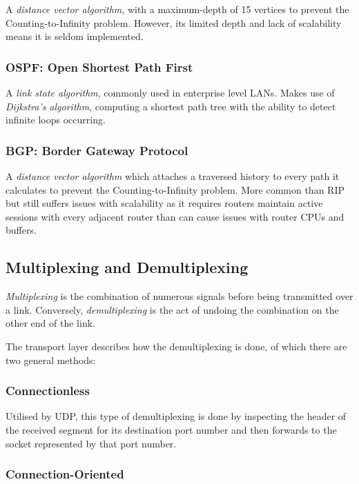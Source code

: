 \documentclass{article}
\begin{document}
A \textit{distance vector algorithm}, with a maximum-depth of 15 vertices to prevent the Counting-to-Infinity problem. However, its limited depth and lack of scalability means it is seldom implemented.

\subsubsection{OSPF: Open Shortest Path First}
A \textit{link state algorithm}, commonly used in enterprise level LANs. Makes use of \textit{Dijkstra's algorithm}, computing a shortest path tree with the ability to detect infinite loops occurring.

\subsubsection{BGP: Border Gateway Protocol}
A \textit{distance vector algorithm} which attaches a traversed history to every path it calculates to prevent the Counting-to-Infinity problem. More common than RIP but still suffers issues with scalability as it requires routers maintain active sessions with every adjacent router than can cause issues with router CPUs and buffers.

\subsection{Multiplexing and Demultiplexing}

\textit{Multiplexing} is the combination of numerous signals before being transmitted over a link. Conversely, \textit{demultiplexing} is the act of undoing the combination on the other end of the link.

The transport layer describes how the demultiplexing is done, of which there are two general methods:

\subsubsection{Connectionless}

Utilised by UDP, this type of demultiplexing is done by inspecting the header of the received segment for its destination port number and then forwards to the socket represented by that port number.

\subsubsection{Connection-Oriented}
\end{document}
